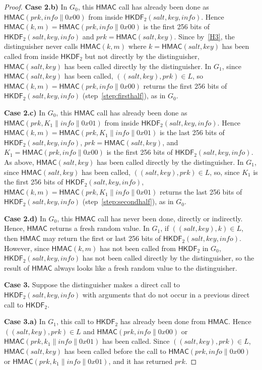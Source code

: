 \documentclass[compsoc, conference, letterpaper, 10pt, times]{IEEEtran}
\newcommand{\HKDF}{\mathsf{HKDF}}
\newcommand{\hkdftwo}{\HKDF_2}
\newcommand{\salt}{\mathit{salt}}
\newcommand{\key}{\mathit{key}}
\newcommand{\info}{\mathit{info}}
\newcommand{\prk}{\mathit{prk}}
\newcommand{\hmac}{\mathsf{HMAC}}
\begin{document}
\begin{proof}
{\bf Case 2.b)} In $G_0$, this $\hmac$ call has already been done as $\hmac(\prk,\info\|0x00)$ from inside
$\hkdftwo(\salt, \key, \info)$. Hence $\hmac(k,m) = \hmac(\prk,\info\|0x00)$ is the first 256 bits of $\hkdftwo(\salt, \key, \info)$ and $\prk = \hmac(\salt,\key)$. 
Since by~\ref{H3}, the distinguisher never calls
$\hmac(k,m)$ where $k = \hmac(\salt,\key)$ has been called from inside
$\hkdftwo$ but not directly by the distinguisher, %
$\hmac(\salt,\key)$ has been called directly by the distinguisher.
%
In $G_1$, since $\hmac(\salt,\key)$ has been called, $((\salt,\key), \prk) \in L$,
so $\hmac(k,m) = \hmac(\prk,\info\|0x00)$ returns the first 256 bits of $\hkdftwo(\salt, \key, \info)$ (step~\ref{step:firsthalf}), as in $G_0$.


{\bf Case 2.c)} In $G_0$, this $\hmac$ call has already been done as $\hmac(\prk,K_1 \|\info\|0x01)$ from inside
$\hkdftwo(\salt, \key, \info)$. Hence $\hmac(k,m) = \hmac(\prk,K_1 \|\info\|0x01)$ is the last 256 bits of $\hkdftwo(\salt, \key, \info)$, $\prk = \hmac(\salt,\key)$,
and $K_1 = \hmac(\prk,\info\|0x00)$ is the first 256 bits of $\hkdftwo(\salt, \key, \info)$. As above, $\hmac(\salt,\key)$ has been called
directly by the distinguisher.
%
In $G_1$, since $\hmac(\salt,\key)$ has been called, $((\salt,\key), \prk) \in L$,
so, since $K_1$ is the first 256 bits of $\hkdftwo(\salt, \key, \info)$, 
$\hmac(k,m) = \hmac(\prk,K_1 \|\info\|0x01)$ returns the last 256 bits of $\hkdftwo(\salt, \key, \info)$ (step~\ref{step:secondhalf}), as in $G_0$.

{\bf Case 2.d)} In $G_0$, this $\hmac$ call has never been done, directly or indirectly.
Hence, $\hmac$ returns a fresh random value.
%
In $G_1$, if $((\salt,\key),k) \in L$, then $\hmac$ may return the
first or last 256 bits of $\hkdftwo(\salt,\key,\info)$. However, since
$\hmac(k,m)$ has not been called from $\hkdftwo$ in $G_0$,
$\hkdftwo(\salt,\key,\info)$ has not been called directly by the distinguisher,
so the result of $\hmac$ always looks like a fresh random value to the
distinguisher.

\medskip 
{\bf Case 3.} Suppose the distinguisher makes a direct call to $\hkdftwo(\salt,\key,\info)$
with arguments that do not occur in a previous direct call to $\hkdftwo$.

{\bf Case 3.a)} In $G_1$, this call to $\hkdftwo$ has already been done from $\hmac$.
Hence $((\salt,\key),\prk) \in L$ and $\hmac(\prk, \info\|0x00)$ or
$\hmac(\prk, k_1\|\info\|0x01)$ has been called. Since $((\salt,\key),\prk) \in L$,
$\hmac(\salt,\key)$ has been called before the call to $\hmac(\prk, \info\|0x00)$ or
$\hmac(\prk, k_1\|\info\|0x01)$, and it has returned $\prk$.


\end{proof}
\end{document}
